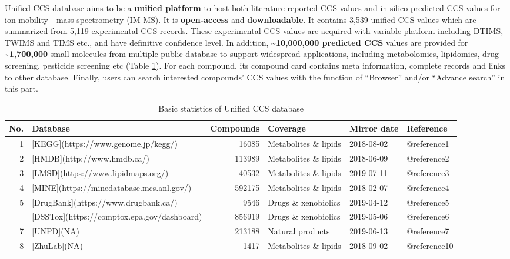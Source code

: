 \documentclass[12pt,]{book}
\theoremstyle{definition}
\theoremstyle{definition}
\theoremstyle{definition}
\theoremstyle{remark}
\begin{document}
Unified CCS database aims to be a \textbf{unified platform} to host both
literature-reported CCS values and in-silico predicted CCS values for
ion mobility - mass spectrometry (IM-MS). It is \textbf{open-access} and
\textbf{downloadable}. It contains 3,539 unified CCS values which are
summarized from 5,119 experimental CCS records. These experimental CCS
values are acquired with variable platform including DTIMS, TWIMS and
TIMS etc., and have definitive confidence level. In addition,
\textbf{\textasciitilde{}10,000,000 predicted CCS} values are provided
for \textbf{\textasciitilde{}1,700,000} small molecules from multiple
public database to support widespread applications, including
metabolomics, lipidomics, drug screening, pesticide screening etc (Table
\ref{tab:table2d1}). For each compound, its compound card contains meta
information, complete records and links to other database. Finally,
users can search interested compounds' CCS values with the function of
``Browser'' and/or ``Advance search'' in this part.

\begin{table}

\caption{\label{tab:table2d1}Basic statistics of Unified CCS database}
\centering
\begin{tabular}[t]{rlrlll}
\toprule
No. & Database & Compounds & Coverage & Mirror date & Reference\\
\midrule
1 & [KEGG](https://www.genome.jp/kegg/) & 16085 & Metabolites \& lipids & 2018-08-02 & @reference1\\
2 & [HMDB](http://www.hmdb.ca/) & 113989 & Metabolites \& lipids & 2018-06-09 & @reference2\\
3 & [LMSD](https://www.lipidmaps.org/) & 40532 & Metabolites \& lipids & 2019-07-11 & @reference3\\
4 & [MINE](https://minedatabase.mcs.anl.gov/) & 592175 & Metabolites \& lipids & 2018-02-07 & @reference4\\
5 & [DrugBank](https://www.drugbank.ca/) & 9546 & Drugs \& xenobiolics & 2019-04-12 & @reference5\\
\addlinespace
6 & [DSSTox](https://comptox.epa.gov/dashboard) & 856919 & Drugs \& xenobiolics & 2019-05-06 & @reference6\\
7 & [UNPD](NA) & 213188 & Natural products & 2019-06-13 & @reference7\\
8 & [ZhuLab](NA) & 1417 & Metabolites \& lipids & 2018-09-02 & @reference10\\
\bottomrule
\end{tabular}
\end{table}
\end{document}
